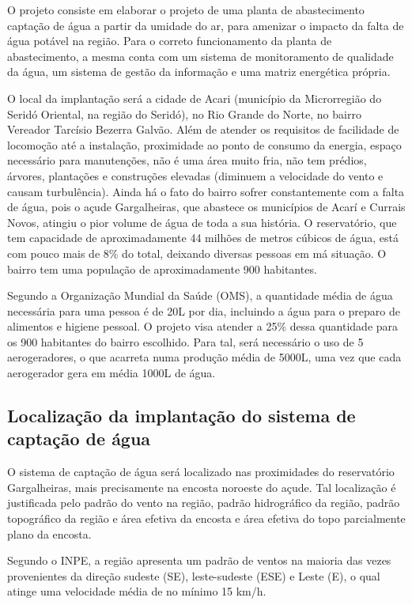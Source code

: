   O projeto consiste em elaborar o projeto de uma planta de abastecimento captação de água a partir da umidade do ar, para amenizar
  o impacto da falta de água potável na região. Para o correto funcionamento da planta de abastecimento, a mesma conta com um sistema
  de monitoramento de qualidade da água, um sistema de gestão da informação e uma matriz energética própria.

  O local da implantação será a cidade de Acari (município da Microrregião do Seridó Oriental, na região do Seridó), no Rio Grande 
  do Norte, no bairro Vereador Tarcísio Bezerra Galvão. Além de atender os requisitos de facilidade de locomoção até a instalação,
  proximidade ao ponto de consumo da energia, espaço necessário para manutenções, não é uma área muito fria, não tem prédios, árvores,
  plantações e construções elevadas (diminuem a velocidade do vento e causam turbulência). Ainda há o fato do bairro sofrer 
  constantemente com a falta de água, pois o açude Gargalheiras, que abastece os municípios de Acarí e Currais Novos, atingiu o 
  pior volume de água de toda a sua história. O reservatório, que tem capacidade de aproximadamente 44 milhões de metros cúbicos
  de água, está com pouco mais de 8\% do total, deixando diversas pessoas em má situação. O bairro tem uma população de 
  aproximadamente 900 habitantes.

  Segundo a Organização Mundial da Saúde (OMS), a quantidade média de água necessária para uma pessoa é de 20L por dia, incluindo
  a água para o preparo de alimentos e higiene pessoal. O projeto visa atender a 25\% dessa quantidade para os 900 habitantes
  do bairro escolhido. Para tal, será necessário o uso de 5 aerogeradores, o que acarreta numa produção média de 5000L, uma vez
  que cada aerogerador gera em média 1000L de água.
  
  \subsection{Localização da implantação do sistema de captação de água}
  
    O sistema de captação de água será localizado nas proximidades do reservatório Gargalheiras, mais precisamente na encosta
    noroeste do açude. Tal localização é justificada pelo padrão do vento na região, padrão hidrográfico da região, padrão
    topográfico da região e área efetiva da encosta e área efetiva do topo parcialmente plano da encosta.
    
    Segundo o INPE, a região apresenta um padrão de ventos na maioria das vezes provenientes da direção sudeste (SE), leste-sudeste
    (ESE) e Leste (E), o qual atinge uma velocidade média de no mínimo 15 km/h.
    
